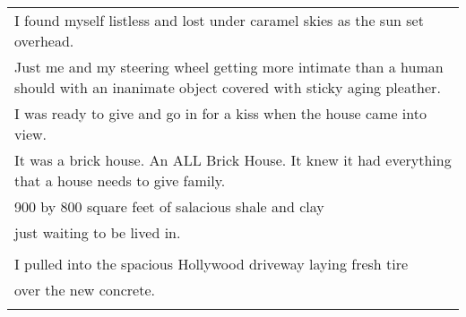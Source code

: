 \documentclass{article}
\begin{document}
\begin{center}
\begin{tabular}{l}
I found myself listless and lost under caramel skies as the sun set overhead. \\
Just me and my steering wheel getting more intimate than a human should with
an inanimate object covered with sticky aging pleather. \\
I was ready to give and go in for a kiss when the house came into view. \\
It was a brick house.  An ALL Brick House.  It knew it had everything
that a house needs to give family.  \\
900 by 800 square feet of salacious shale and clay \\
just waiting to be lived in. \\
\\
I pulled into the spacious Hollywood driveway laying fresh tire \\
over the new concrete. \\

\\
\end{tabular}
\end{center}
\end{document}
